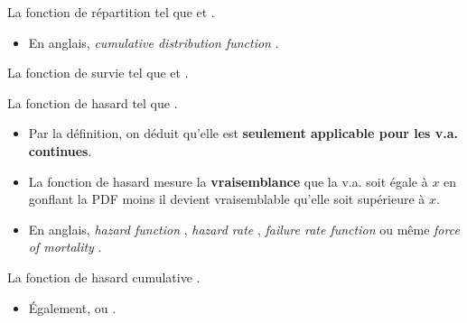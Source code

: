 \documentclass[10pt, french]{article}
\begin{document}
\begin{multicols*}{2}
\begin{definitionNOHFILL}
La fonction de répartition  tel que  et .

\begin{itemize}
	\item	En anglais, \og \textit{cumulative distribution function} \fg{}.
\end{itemize}
\end{definitionNOHFILL}

\begin{definitionNOHFILL}
La fonction de survie  tel que  et .
\end{definitionNOHFILL}

\begin{definitionNOHFILL}
La fonction de hasard  tel que .

\begin{itemize}
	\item	Par la définition, on déduit qu'elle est \textbf{seulement applicable pour les v.a. continues}.
	\item	La fonction de hasard mesure la \textbf{vraisemblance} que la v.a. soit égale à $x$ en gonflant la PDF moins il devient vraisemblable qu'elle soit supérieure à $x$.
\end{itemize}

\begin{itemize}
	\item	En anglais, \og \textit{hazard function} \fg{}, \og \textit{hazard rate} \fg{}, \og \textit{failure rate function} \fg{} ou même \og \textit{force of mortality} \fg{}.
\end{itemize}
\end{definitionNOHFILL}

\begin{definitionNOHFILL}
La fonction de hasard cumulative .
\begin{itemize}
	\item	Également,  ou .
\end{itemize}
\end{definitionNOHFILL}


\end{multicols*}
\end{document}

